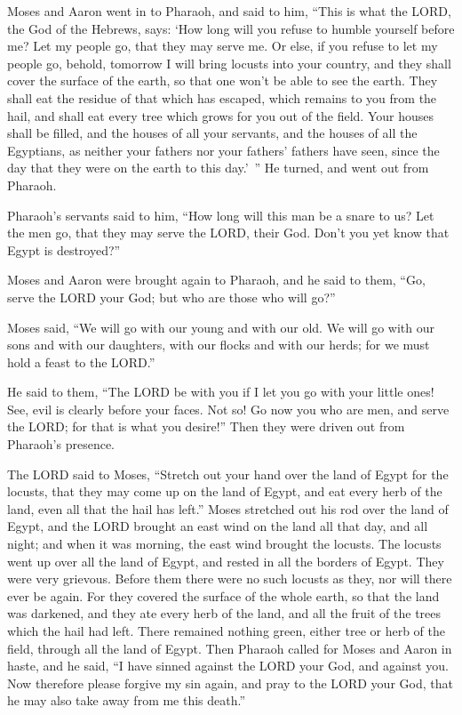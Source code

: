 \myverse{}Moses and Aaron went in to Pharaoh, and said to him, “This is
what the LORD, the God of the Hebrews, says: ‘How long will you refuse to humble yourself before me? Let
my people go, that they may serve me.
\myverse{}Or else, if you refuse to let my people go, behold, tomorrow I will bring locusts
into your country,
\myverse{}and they shall cover the surface of the earth, so that one won’t be able to
see the earth. They shall eat the residue of that which has escaped, which remains to you from the hail,
and shall eat every tree which grows for you out of the field.
\myverse{}Your houses shall be filled, and the houses of all your servants, and the houses
of all the Egyptians, as neither your fathers nor your fathers’ fathers have seen, since the day that
they were on the earth to this day.’ ” He turned, and went out from Pharaoh.


\myverse{}Pharaoh’s servants said to him, “How long will this man be a snare
to us? Let the men go, that they may serve the LORD, their God. Don’t you yet know that Egypt is destroyed?”


\myverse{}Moses and Aaron were brought again to Pharaoh, and he said to
them, “Go, serve the LORD your God; but who are those who will go?”


\myverse{}Moses said, “We will go with our young and with our old. We will
go with our sons and with our daughters, with our flocks and with our herds; for we must hold a feast
to the LORD.”


\myverse{}He said to them, “The LORD be with you if I let you go with
your little ones! See, evil is clearly before your faces.
\myverse{}Not so! Go now you who are men, and serve the LORD; for that is what you
desire!” Then they were driven out from Pharaoh’s presence.


\myverse{}The LORD said to Moses, “Stretch out your hand over the land
of Egypt for the locusts, that they may come up on the land of Egypt, and eat every herb of the land,
even all that the hail has left.”
\myverse{}Moses stretched out his rod over the land of Egypt, and the LORD brought
an east wind on the land all that day, and all night; and when it was morning, the east wind brought the
locusts.
\myverse{}The locusts went up over all the land of Egypt, and rested in all the borders
of Egypt. They were very grievous. Before them there were no such locusts as they, nor will there ever
be again.
\myverse{}For they covered the surface of the whole earth, so that the land was darkened,
and they ate every herb of the land, and all the fruit of the trees which the hail had left. There remained
nothing green, either tree or herb of the field, through all the land of Egypt.
\myverse{}Then Pharaoh called for Moses and Aaron in haste, and he said, “I have sinned
against the LORD your God, and against you.
\myverse{}Now therefore please forgive my sin again, and pray to the LORD your God,
that he may also take away from me this death.”


